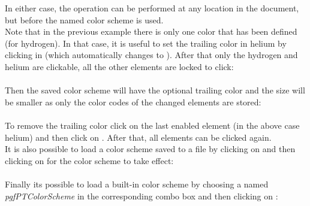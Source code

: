 In either case, the operation can be performed at any location in the document, but before the named color scheme is used.
\\ [4pt]Note that in the previous example there is only one color that has been defined (for hydrogen). In that case, it is useful to set the trailing color in helium by clicking in  (which automatically changes to ). After that only the hydrogen and helium are clickable, all the other elements are locked to click:
\\ [4pt]
\\ [8pt]Then the saved color scheme will have the optional trailing color and the size will be smaller as only the color codes of the changed elements are stored:
\\ [4pt]
\\ [8pt]To remove the trailing color click on the last enabled element (in the  above case helium) and then click on . After that, all elements can be clicked again.
\\ [8pt]It is also possible to load a color scheme saved to a file by clicking on  and then clicking on  for the color scheme to take effect:
\\ [4pt]
\\ [4pt]Finally its possible to load a built-in color scheme by choosing a named \textit{pgfPTColorScheme} in the corresponding combo box and then clicking on :
\\ [4pt]
\\ [20pt]
\endinput
